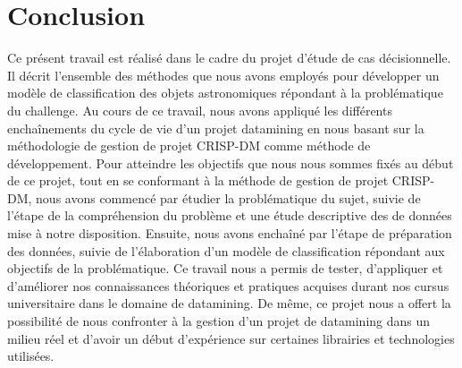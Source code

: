 \chapter*{Conclusion}
Ce présent travail est réalisé dans le cadre du projet d'étude de cas décisionnelle. Il décrit l'ensemble des méthodes que nous avons employés pour développer un modèle de classification des objets astronomiques répondant à la problématique du challenge.
\newline Au cours de ce travail, nous avons appliqué les différents enchaînements du cycle de vie d'un projet datamining en nous basant sur la méthodologie de gestion de projet CRISP-DM comme méthode de développement.
\newline
Pour atteindre les objectifs que nous nous sommes fixés au début de ce projet, tout en se conformant à la méthode de gestion de projet CRISP-DM, nous avons commencé par étudier la problématique du sujet, suivie de l'étape de la compréhension du problème et une étude descriptive des de données mise à notre disposition.
\newline Ensuite, nous avons enchaîné par l'étape de préparation des données, suivie de l'élaboration d'un modèle de classification répondant aux objectifs de la problématique.
\newline Ce travail nous a permis de tester, d'appliquer et d'améliorer nos connaissances théoriques et pratiques acquises durant nos cursus universitaire dans le domaine de datamining. De même, ce projet nous a offert la possibilité de nous confronter à la gestion d'un projet de datamining dans un milieu réel et d'avoir un début d'expérience sur certaines librairies et technologies utilisées.
